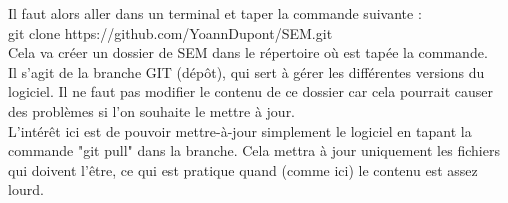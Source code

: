 \documentclass[manual-fr.tex]{subfiles}
\begin{document}
Il faut alors aller dans un terminal et taper la commande suivante :\\

git clone https://github.com/YoannDupont/SEM.git\\

Cela va créer un dossier de SEM dans le répertoire où est tapée la commande. \\

Il s'agit de la branche GIT (dépôt), qui sert à gérer les différentes versions du logiciel. Il ne faut pas modifier le contenu de ce dossier car cela pourrait causer des problèmes si l'on souhaite le mettre à jour.\\

L'intérêt ici est de pouvoir mettre-à-jour simplement le logiciel en tapant la commande "git pull" dans la branche. Cela mettra à jour uniquement les fichiers qui doivent l'être, ce qui est pratique quand (comme ici) le contenu est assez lourd.
\end{document}
